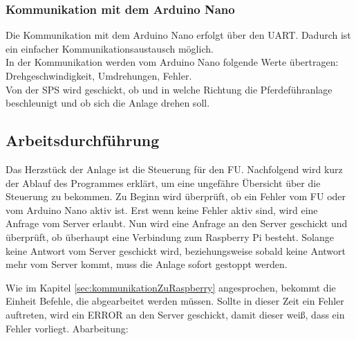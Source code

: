 \subsubsection{Kommunikation mit dem Arduino Nano}
\label{sec:kommunikationnZuArduinoNano}

Die Kommunikation mit dem Arduino Nano erfolgt über den \ac{UART}. Dadurch ist ein einfacher Kommunikationsaustausch möglich.\\
In der Kommunikation werden vom Arduino Nano folgende Werte übertragen: Drehgeschwindigkeit, Umdrehungen, Fehler.\\
Von der SPS wird geschickt, ob und in welche Richtung die Pferdeführanlage beschleunigt und ob sich die Anlage drehen soll.

\subsection{Arbeitsdurchführung}
\label{sec:arbeitsdurchführung}

Das Herzstück der Anlage ist die Steuerung für den \acl{FU}. Nachfolgend wird kurz der Ablauf des Programmes erklärt, um eine ungefähre Übersicht über die Steuerung zu bekommen. \newline{}
Zu Beginn wird überprüft, ob ein Fehler vom \ac{FU} oder vom Arduino Nano aktiv ist. Erst wenn keine Fehler aktiv sind, wird eine Anfrage vom Server erlaubt. Nun wird eine Anfrage an den Server geschickt und überprüft, ob überhaupt eine Verbindung zum Raspberry Pi besteht. Solange keine Antwort vom Server geschickt wird, beziehungsweise sobald keine Antwort mehr vom Server kommt, muss die Anlage sofort gestoppt werden. \newpage

Wie im Kapitel \ref{sec:kommunikationZuRaspberry} angesprochen, bekommt die Einheit Befehle, die abgearbeitet werden müssen. Sollte in dieser Zeit ein Fehler auftreten, wird  ein ERROR an den Server geschickt, damit dieser weiß, dass ein Fehler vorliegt. \newline{}
Abarbeitung:

